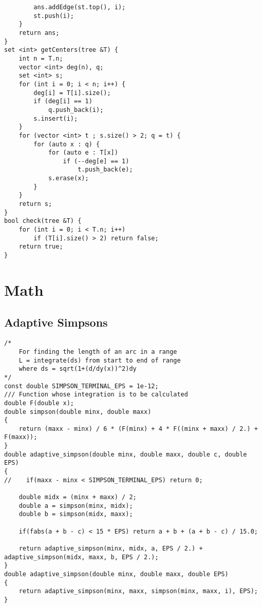 \documentclass[FSZ,a4paper,onesided]{article}
\begin{document}
\begin{multicols*}{\COLS}
\begin{lstlisting}
        ans.addEdge(st.top(), i);
        st.push(i);
    }
    return ans;
}
set <int> getCenters(tree &T) {
    int n = T.n;
    vector <int> deg(n), q;
    set <int> s;
    for (int i = 0; i < n; i++) {
        deg[i] = T[i].size();
        if (deg[i] == 1)
            q.push_back(i);
        s.insert(i);
    }
    for (vector <int> t ; s.size() > 2; q = t) {
        for (auto x : q) {
            for (auto e : T[x]) 
                if (--deg[e] == 1)
                    t.push_back(e);
            s.erase(x);
        }
    }
    return s;
}
bool check(tree &T) {
    for (int i = 0; i < T.n; i++)
        if (T[i].size() > 2) return false;
    return true;
}\end{lstlisting}
\section{Math}
\subsection{Adaptive Simpsons}
\begin{lstlisting}
/*
    For finding the length of an arc in a range
    L = integrate(ds) from start to end of range
    where ds = sqrt(1+(d/dy(x))^2)dy
*/
const double SIMPSON_TERMINAL_EPS = 1e-12;
/// Function whose integration is to be calculated
double F(double x);
double simpson(double minx, double maxx)
{
    return (maxx - minx) / 6 * (F(minx) + 4 * F((minx + maxx) / 2.) + F(maxx));
}
double adaptive_simpson(double minx, double maxx, double c, double EPS)
{
//    if(maxx - minx < SIMPSON_TERMINAL_EPS) return 0;

    double midx = (minx + maxx) / 2;
    double a = simpson(minx, midx);
    double b = simpson(midx, maxx);

    if(fabs(a + b - c) < 15 * EPS) return a + b + (a + b - c) / 15.0;

    return adaptive_simpson(minx, midx, a, EPS / 2.) + adaptive_simpson(midx, maxx, b, EPS / 2.);
}
double adaptive_simpson(double minx, double maxx, double EPS)
{
    return adaptive_simpson(minx, maxx, simpson(minx, maxx, i), EPS);
}

\end{lstlisting}

\end{multicols*}
\end{document}
